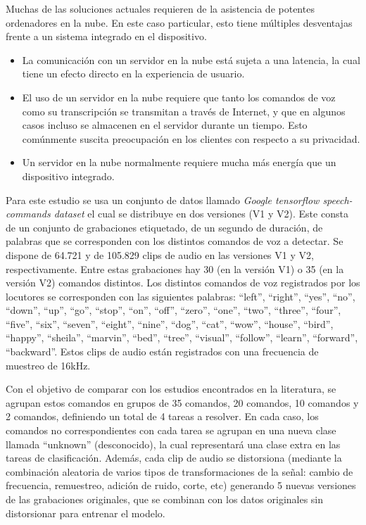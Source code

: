 \documentclass[10pt,a4paper,titlepage,table]{report}
\begin{document}
Muchas de las soluciones actuales requieren de la asistencia de potentes ordenadores en la nube. En este caso particular, esto tiene múltiples desventajas frente a un sistema integrado en el dispositivo.

\begin{itemize}
	\item La comunicación con un servidor en la nube está sujeta a una latencia, la cual tiene un efecto directo en la experiencia de usuario.
	\item El uso de un servidor en la nube requiere que tanto los comandos de voz como su transcripción se transmitan a través de Internet, y que en algunos casos incluso se almacenen en el servidor durante un tiempo. Esto comúnmente suscita preocupación en los clientes con respecto a su privacidad. 
	\item Un servidor en la nube normalmente requiere mucha más energía que un dispositivo integrado.
\end{itemize}

Para este estudio se usa un conjunto de datos llamado \textit{Google tensorflow speech-commands dataset} el cual se distribuye en dos versiones (V1 y V2). Este consta de un conjunto de grabaciones etiquetado, de un segundo de duración, de palabras que se corresponden con los distintos comandos de voz a detectar. Se dispone de 64.721 y de 105.829 clips de audio en las versiones V1 y V2, respectivamente. Entre estas grabaciones hay 30 (en la versión V1) o 35 (en la versión V2) comandos distintos. Los distintos comandos de voz registrados por los locutores se corresponden con las siguientes palabras: ``left'', ``right'', ``yes'', ``no'', ``down'', ``up'', ``go'', ``stop'', ``on'', ``off'', ``zero'', ``one'', ``two'', ``three'', ``four'', ``five'', ``six'', ``seven'', ``eight'', ``nine'', ``dog'', ``cat'', ``wow'', ``house'', ``bird'', ``happy'', ``sheila'', ``marvin'', ``bed'', ``tree'', ``visual'', ``follow'', ``learn'', ``forward'', ``backward''. Estos clips de audio están registrados con una frecuencia de muestreo de 16kHz.

Con el objetivo de comparar con los estudios encontrados en la literatura, se agrupan estos comandos en grupos de 35 comandos, 20 comandos, 10 comandos y 2 comandos, definiendo un total de 4 tareas a resolver. En cada caso, los comandos no correspondientes con cada tarea se agrupan en una nueva clase llamada ``unknown'' (desconocido), la cual representará una clase extra en las tareas de clasificación. Además, cada clip de audio se distorsiona (mediante la combinación aleatoria de varios tipos de transformaciones de la señal: cambio de frecuencia, remuestreo, adición de ruido, corte, etc) generando 5 nuevas versiones de las grabaciones originales, que se combinan con los datos originales sin distorsionar para entrenar el modelo.
\end{document}
